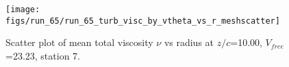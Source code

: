 \begin{figure}[H]
\centering
\texttt{[image: figs/run\_65/run\_65\_turb\_visc\_by\_vtheta\_vs\_r\_meshscatter]}
\caption{Scatter plot of mean total viscosity $\nu$ vs radius at $z/c$=10.00, $V_{free}$=23.23, station 7.}
\label{fig:run_65_turb_visc_by_vtheta_vs_r_meshscatter}
\end{figure}


